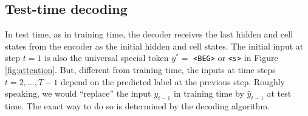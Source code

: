 \documentclass[11pt,a4paper]{article}
\begin{document}





\subsection{Test-time decoding}

In test time, as in training time, the decoder receives the last hidden and cell states from the encoder as the initial hidden and cell states. The initial input at step $t = 1$ is also the universal special token $y^* =$ \texttt{<BEG>} or \texttt{<s>} in Figure \ref{fig:attention}. But, different from training time, the inputs at time steps $t = 2, \dots, T - 1$ depend on the predicted label at the previous step. Roughly speaking, we would ``replace'' the input $y_{t-1}$ in training time by $\hat{y}_{t-1}$ at test time. The exact way to do so is determined by the decoding algorithm.
\end{document}

